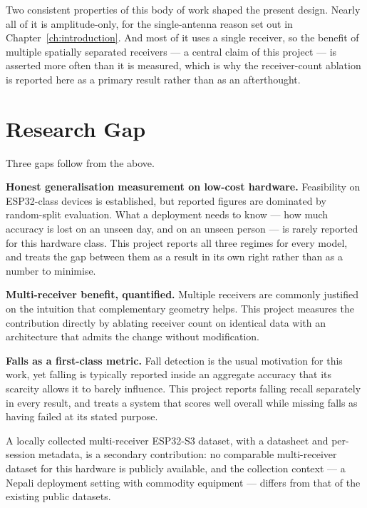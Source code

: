 Two consistent properties of this body of work shaped the present design.
Nearly all of it is amplitude-only, for the single-antenna reason set out in
Chapter~\ref{ch:introduction}. And most of it uses a single receiver, so the
benefit of multiple spatially separated receivers --- a central claim of this
project --- is asserted more often than it is measured, which is why the
receiver-count ablation is reported here as a primary result rather than as
an afterthought.

\section{Research Gap}

Three gaps follow from the above.

\textbf{Honest generalisation measurement on low-cost hardware.} Feasibility
on ESP32-class devices is established, but reported figures are dominated by
random-split evaluation. What a deployment needs to know --- how much
accuracy is lost on an unseen day, and on an unseen person --- is rarely
reported for this hardware class. This project reports all three regimes for
every model, and treats the gap between them as a result in its own right
rather than as a number to minimise.

\textbf{Multi-receiver benefit, quantified.} Multiple receivers are commonly
justified on the intuition that complementary geometry helps. This project
measures the contribution directly by ablating receiver count on identical
data with an architecture that admits the change without modification.

\textbf{Falls as a first-class metric.} Fall detection is the usual
motivation for this work, yet falling is typically reported inside an
aggregate accuracy that its scarcity allows it to barely influence. This
project reports falling recall separately in every result, and treats a
system that scores well overall while missing falls as having failed at its
stated purpose.

A locally collected multi-receiver ESP32-S3 dataset, with a datasheet and
per-session metadata, is a secondary contribution: no comparable multi-receiver
dataset for this hardware is publicly available, and the collection
context --- a Nepali deployment setting with commodity equipment --- differs
from that of the existing public datasets.
